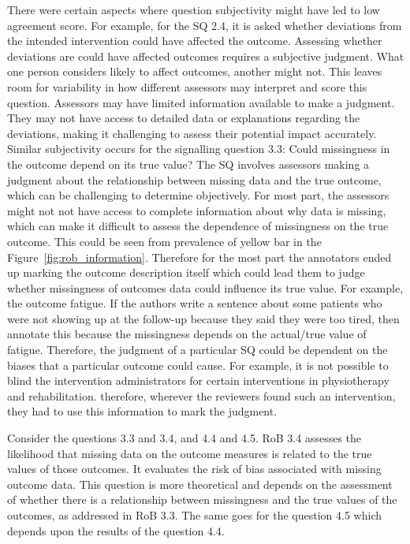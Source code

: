 \documentclass[sn-mathphys,Numbered]{sn-jnl}%
\theoremstyle{thmstyleone}%
\theoremstyle{thmstyletwo}%
\theoremstyle{thmstylethree}%
\begin{document}
There were certain aspects where question subjectivity might have led to low agreement score.
For example, for the SQ 2.4, it is asked whether deviations from the intended intervention could have affected the outcome.
Assessing whether deviations are could have affected outcomes requires a subjective judgment.
What one person considers likely to affect outcomes, another might not.
This leaves room for variability in how different assessors may interpret and score this question.
Assessors may have limited information available to make a judgment.
They may not have access to detailed data or explanations regarding the deviations, making it challenging to assess their potential impact accurately.
Similar subjectivity occurs for the signalling question 3.3: Could missingness in the outcome depend on its true value?
The SQ involves assessors making a judgment about the relationship between missing data and the true outcome, which can be challenging to determine objectively.
For most part, the assessors might not not have access to complete information about why data is missing, which can make it difficult to assess the dependence of missingness on the true outcome.
This could be seen from prevalence of yellow bar in the Figure~\ref{fig:rob_information}.
Therefore for the most part the annotators ended up marking the outcome description itself which could lead them to judge whether missingness of outcomes data could influence its true value.
For example, the outcome fatigue.
If the authors write a sentence about some patients who were not showing up at the follow-up because they said they were too tired, then annotate this because the missingness depends on the actual/true value of fatigue.
Therefore, the judgment of a particular SQ could be dependent on the biases that a particular outcome could cause.
For example, it is not possible to blind the intervention administrators for certain interventions in physiotherapy and rehabilitation. therefore, wherever the reviewers found such an intervention, they had to use this information to mark the judgment.

Consider the questions 3.3 and 3.4, and 4.4 and 4.5.
RoB 3.4 assesses the likelihood that missing data on the outcome measures is related to the true values of those outcomes.
It evaluates the risk of bias associated with missing outcome data.
This question is more theoretical and depends on the assessment of whether there is a relationship between missingness and the true values of the outcomes, as addressed in RoB 3.3.
The same goes for the question 4.5 which depends upon the results of the question 4.4.
\end{document}
